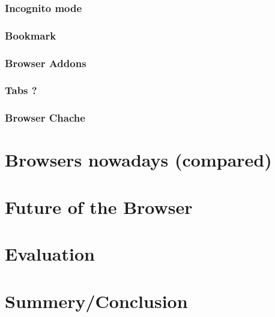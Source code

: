 \documentclass[runningheads]{llncs}
\begin{document}
\subsubsection{Incognito mode}
\subsubsection{Bookmark}
\subsubsection{Browser Addons}
\subsubsection{Tabs ?}
\subsubsection{Browser Chache}


\section{Browsers nowadays (compared)}

\section{Future of the Browser}

\section{Evaluation}

\section{Summery/Conclusion}
\end{document}
